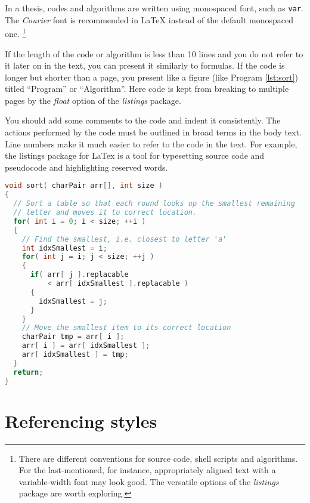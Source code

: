 \documentclass[twoside,draftfooter]{tutthesis} %
\begin{document}
In a thesis, codes and algorithms are written using monospaced font, such as \texttt{var}.
The \emph{Courier} font is recommended in LaTeX instead of the default monospaced one.
\footnote{There are different conventions for source code, shell scripts and algorithms.
  For the last-mentioned, for instance, appropriately aligned text with a variable-width font may look good.
  The versatile options of the \emph{listings} package are worth exploring.}

If the length of the code or algorithm is less than 10 lines and you do not refer to it later on in the text, you can present it similarly to formulas.
If the code is longer but shorter than a page, you present like a figure (like Program \ref{lst:sort}) titled ``Program'' or ``Algorithm''.
Here code is kept from breaking to multiple pages by the \emph{float} option of the \emph{listings} package.

You should add some comments to the code and indent it consistently.
The actions performed by the code must be outlined in broad terms in the body text.
Line numbers make it much easier to refer to the code in the text.
For example, the listings package for LaTex \citep{Heinz2006, Oetiker2011} is a tool for typesetting source code and pseudocode and highlighting reserved words.

\iftrue %
\begin{lstlisting}[float,caption={Example of presenting program code as a figure in a thesis.},label={lst:sort},language=C]
void sort( charPair arr[], int size )
{
  // Sort a table so that each round looks up the smallest remaining
  // letter and moves it to correct location.
  for( int i = 0; i < size; ++i )
  {
    // Find the smallest, i.e. closest to letter 'a'
    int idxSmallest = i;
    for( int j = i; j < size; ++j )
    {
      if( arr[ j ].replacable
          < arr[ idxSmallest ].replacable )
      {
        idxSmallest = j;
      }
    }
    // Move the smallest item to its correct location
    charPair tmp = arr[ i ];
    arr[ i ] = arr[ idxSmallest ];
    arr[ idxSmallest ] = tmp;
  }
  return;
}
\end{lstlisting}
\else
\label{lst:sort}
Code example commented out in this version. Load the \texttt{listings} package if you are using code listings.
\fi




\chapter{Referencing styles}
\label{ch:referencingstyles}
\end{document}
